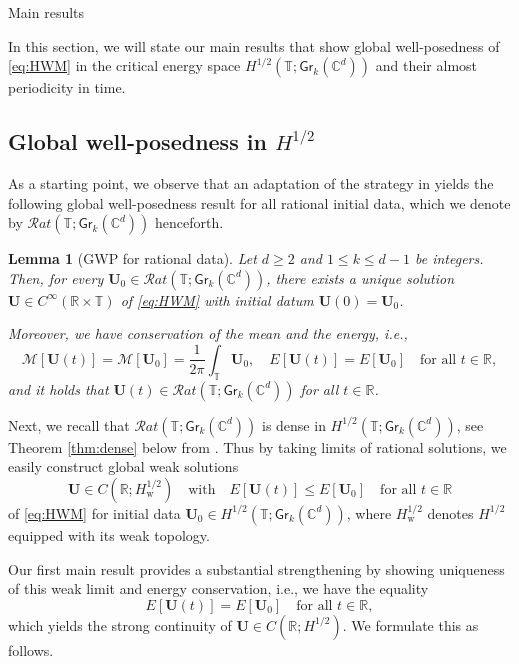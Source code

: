 \documentclass[10pt,reqno,a4paper]{amsart}
\makeatletter
\newtheorem{lem}{Lemma}[section]
\theoremstyle{definition}
\theoremstyle{remark}
\theoremstyle{remark}
\numberwithin{equation}{section}
\newcommand{\C}{\mathbb{C}}
\newcommand{\R}{\mathbb{R}}
\newcommand{\T}{\mathbb{T}}
\newcommand{\Mean}{\mathscr{M}}
\newcommand{\Ub}{\mathbf{U}}
\newcommand{\Gr}{\mathsf{Gr}}
\def\section{\@startsection{section}{1}%
  \z@{1.5\linespacing\@plus\linespacing}{.5\linespacing}%
  {\normalfont\bfseries\large\centering}}
\makeatother
\begin{document}
\section{Main results}

\label{sec:main}

In this section, we will state our main results that show global well-posedness of \eqref{eq:HWM} in the critical energy space $H^{1/2}(\T; \Gr_k(\C^d))$ and their almost periodicity in time. 


\subsection{Global well-posedness in $H^{1/2}$}
As a starting point, we observe that an adaptation of the strategy in \cite{GeLe-25} yields the following global well-posedness result for all rational initial data, which we denote by $\mathcal{R}at(\T; \Gr_k(\C^d))$ henceforth.

\begin{lem}[GWP for rational data]
Let $d \geq 2$ and $1 \leq k \leq d-1$ be integers. Then, for every $\Ub_0 \in \mathcal{R}at(\T; \Gr_k(\C^d))$, there exists a unique solution $\Ub \in C^\infty(\R \times \T)$ of \eqref{eq:HWM} with initial datum $\Ub(0) =\Ub_0$. 

Moreover, we have conservation of the mean and the energy, i.e.,
$$
\Mean[\Ub(t)] = \Mean[\Ub_0] = \frac{1}{2 \pi} \int_\T \Ub_0, \quad E[\Ub(t)] = E[\Ub_0] \quad \mbox{for all $t \in \R$},
$$
and it holds that $\Ub(t) \in \mathcal{R}at(\T; \Gr_k(\C^d))$ for all $t \in \R$.
\end{lem}

Next, we recall that $\mathcal{R}at(\T; \Gr_k(\C^d))$ is dense in $H^{1/2}(\T; \Gr_k(\C^d))$, see Theorem \ref{thm:dense} below from \cite{GeLe-25}. Thus by taking limits of rational solutions, we easily construct  global weak solutions
$$
\Ub \in C(\R; H^{1/2}_{\mathrm{w}}) \quad \mbox{with} \quad E[\Ub(t)] \leq E[\Ub_0] \quad \mbox{for all $t \in \R$}
$$ 
of \eqref{eq:HWM} for initial data $\Ub_0 \in H^{1/2}(\T; \Gr_k(\C^d))$, where $H^{1/2}_{\mathrm{w}}$ denotes $H^{1/2}$ equipped with its weak topology. 

Our first main result provides a substantial strengthening by showing uniqueness of this weak limit and energy conservation, i.e., we have the equality 
$$
E[\Ub(t)] = E[\Ub_0] \quad \mbox{for all $t \in \R$},
$$ 
which yields the strong continuity of $\Ub \in C(\R; H^{1/2})$. We  formulate this as follows.
\end{document}
